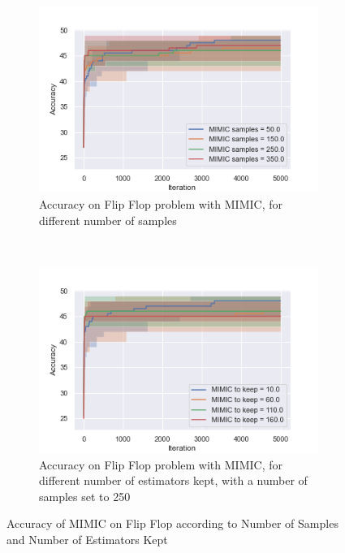 \documentclass[10pt]{article}
\begin{document}
				\begin{figure}[h]
					\centering
					\begin{subfigure}[t]{0.45\columnwidth}
						\centering
						\includegraphics[width=\linewidth]{../graphics/flip_flop_MIMIC_Iteration_Error_MIMIC_samples.png}
						\caption{Accuracy on Flip Flop problem with MIMIC, for different number of samples}
						\label{ff:mimic_samples}
					\end{subfigure}
					~
					\begin{subfigure}[t]{0.45\columnwidth}
						\centering
						\includegraphics[width=\linewidth]{../graphics/flip_flop_MIMIC_Iteration_Error_MIMIC_to_keep.png}
						\caption{Accuracy on Flip Flop problem with MIMIC, for different number of estimators kept, with a number of samples set to 250}
						\label{ff:mimic_to_keep}
					\end{subfigure}
					\caption{Accuracy of MIMIC on Flip Flop according to Number of Samples and Number of Estimators Kept}
					\label{ff:mimic}
				\end{figure}
\end{document}
